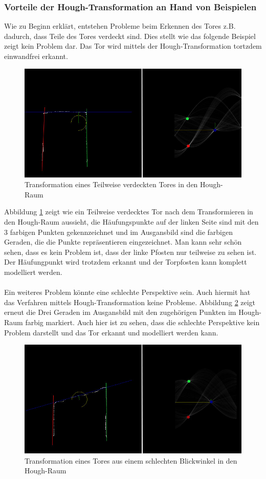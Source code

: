 \documentclass[a4paper,12pt]{article}
\begin{document}
\subsubsection{Vorteile der Hough-Transformation an Hand von Beispielen}
Wie zu Beginn erklärt, entstehen Probleme beim Erkennen des Tores z.B. dadurch, dass Teile des Tores verdeckt sind. Dies stellt wie das folgende Beispiel zeigt kein Problem dar. Das Tor wird mittels der Hough-Transformation tortzdem einwandfrei erkannt.
\begin{figure}[H]
\includegraphics[scale=0.5]{hough_beispiel.jpg}
\caption{Transformation eines Teilweise verdeckten Tores in den Hough-Raum}
\label{fig:houg-beispiel1}
\end{figure}
Abbildung \ref{fig:houg-beispiel1} zeigt wie ein Teilweise verdecktes Tor nach dem Transformieren in den Hough-Raum aussieht, die Häufungspunkte auf der linken Seite sind mit den 3 farbigen Punkten gekennzeichnet und im Ausgansbild sind die farbigen Geraden, die die Punkte repräsentieren eingezeichnet. Man kann sehr schön sehen, dass es kein Problem ist, dass der linke Pfosten nur teilweise zu sehen ist. Der Häufungpunkt wird trotzdem erkannt und der Torpfosten kann komplett modelliert werden. \\
\\
Ein weiteres Problem könnte eine schlechte Perspektive sein. Auch hiermit hat das Verfahren mittels Hough-Transformation keine Probleme. Abbildung \ref{fig:houg-beispiel2} zeigt erneut die Drei Geraden im Ausgansbild mit den zugehörigen Punkten im Hough-Raum farbig markiert. Auch hier ist zu sehen, dass die schlechte Perspektive kein Problem darstellt und das Tor erkannt und modelliert werden kann.
\begin{figure}[H]
\includegraphics[scale=0.5]{hough_beispiel2.jpg}
\caption{Transformation eines Tores aus einem schlechten Blickwinkel in den Hough-Raum}
\label{fig:houg-beispiel2}
\end{figure}
\end{document}
